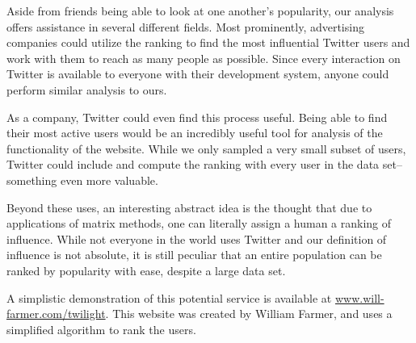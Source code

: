 Aside from friends being able to look at one another's popularity, our analysis offers assistance in several different fields. Most prominently, advertising companies could utilize the ranking to find the most influential Twitter users and work with them to reach as many people as possible. Since every interaction on Twitter is available to everyone with their development system, anyone could perform similar analysis to ours.

As a company, Twitter could even find this process useful. Being able to find their most active users would be an incredibly useful tool for analysis of the functionality of the website. While we only sampled a very small subset of users, Twitter could include and compute the ranking with every user in the data set--something even more valuable.

Beyond these uses, an interesting abstract idea is the thought that due to applications of matrix methods, one can literally assign a human a ranking of influence. While not everyone in the world uses Twitter and our definition of influence is not absolute, it is still peculiar that an entire population can be ranked by popularity with ease, despite a large data set.

A simplistic demonstration of this potential service is available at \url{www.will-farmer.com/twilight}. This website was created by William Farmer, and uses a simplified algorithm to rank the users.
